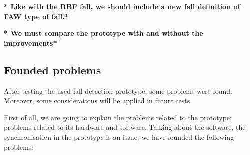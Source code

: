 \documentclass[conference]{IEEEtran}
\theoremstyle{definition}
\begin{document}
\textbf{* Like with the RBF fall, we should include a new fall definition of FAW type of fall.*}

\textbf{* We must compare the prototype with and without the improvements*}

\subsection{Founded problems}

After testing the used fall detection prototype, some problems were 
found. Moreover, some considerations will be applied in future tests.

First of all, we are going to explain the problems related to the prototype; problems related to its hardware and
software. Talking about the software, the synchronisation in the prototype is an issue; we have founded the following problems:
\end{document}
